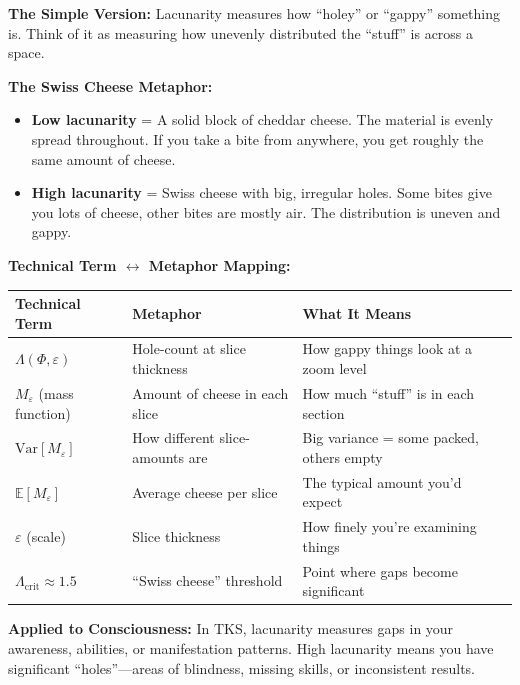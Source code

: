 \documentclass[11pt,twoside]{book}
\newcommand{\Frac}{\Phi}
\newcommand{\Lacunarity}{\Lambda}
\begin{document}
\begin{tcolorbox}[colback=green!5!white,colframe=green!65!black,title=\textbf{Plain English: What is Lacunarity?},breakable]

\textbf{The Simple Version:}
Lacunarity measures how ``holey'' or ``gappy'' something is. Think of it as measuring how unevenly distributed the ``stuff'' is across a space.

\textbf{The Swiss Cheese Metaphor:}
\begin{itemize}
    \item \textbf{Low lacunarity} = A solid block of cheddar cheese. The material is evenly spread throughout. If you take a bite from anywhere, you get roughly the same amount of cheese.
    \item \textbf{High lacunarity} = Swiss cheese with big, irregular holes. Some bites give you lots of cheese, other bites are mostly air. The distribution is uneven and gappy.
\end{itemize}

\textbf{Technical Term $\leftrightarrow$ Metaphor Mapping:}
\begin{center}
\footnotesize
\begin{tabularx}{\textwidth}{>{\raggedright\arraybackslash}X|>{\raggedright\arraybackslash}X|>{\raggedright\arraybackslash}X}
\toprule
\textbf{Technical Term} & \textbf{Metaphor} & \textbf{What It Means} \\
\midrule
$\Lacunarity(\Frac, \varepsilon)$ & Hole-count at slice thickness & How gappy things look at a zoom level \\
$M_\varepsilon$ (mass function) & Amount of cheese in each slice & How much ``stuff'' is in each section \\
$\mathrm{Var}[M_\varepsilon]$ & How different slice-amounts are & Big variance = some packed, others empty \\
$\mathbb{E}[M_\varepsilon]$ & Average cheese per slice & The typical amount you'd expect \\
$\varepsilon$ (scale) & Slice thickness & How finely you're examining things \\
$\Lacunarity_{\mathrm{crit}} \approx 1.5$ & ``Swiss cheese'' threshold & Point where gaps become significant \\
\bottomrule
\end{tabularx}
\end{center}

\textbf{Applied to Consciousness:}
In TKS, lacunarity measures gaps in your awareness, abilities, or manifestation patterns. High lacunarity means you have significant ``holes''---areas of blindness, missing skills, or inconsistent results.

\end{tcolorbox}
\end{document}
